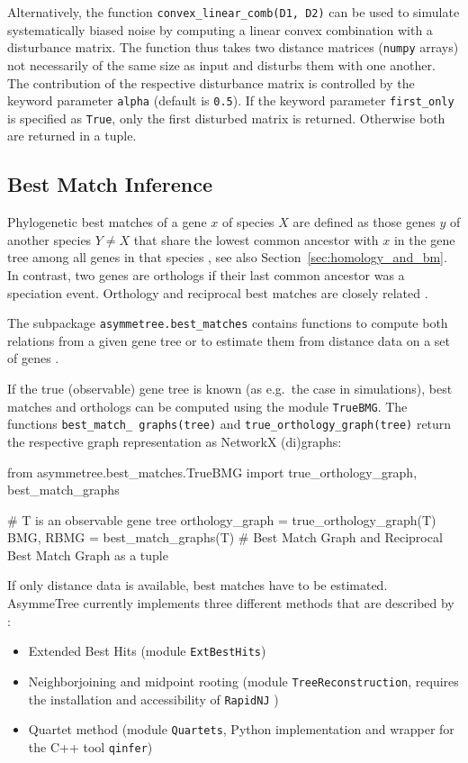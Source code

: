 \documentclass[hidelinks,11pt]{scrreprt}
\begin{document}
Alternatively, the function \texttt{convex\_linear\_comb(D1, D2)} can be used to simulate systematically biased noise by computing a linear convex combination with a disturbance matrix.
The function thus takes two distance matrices (\texttt{numpy} arrays) not necessarily of the same size as input and disturbs them with one another.
The contribution of the respective disturbance matrix is controlled by the keyword parameter \texttt{alpha} (default is \texttt{0.5}).
If the keyword parameter \texttt{first\_only} is specified as \texttt{True}, only the first disturbed matrix is returned.
Otherwise both are returned in a tuple.


\subsection{Best Match Inference}

Phylogenetic best matches of a gene $x$ of species $X$ are defined as those genes $y$ of another species $Y\ne X$ that share the lowest common ancestor with $x$ in the gene tree among all genes in that species \citep{geiss2019a,geiss2020b,geiss2020c}, see also Section~\ref{sec:homology_and_bm}.
In contrast, two genes are orthologs if their last common ancestor was a speciation event.
Orthology and reciprocal best matches are closely related \citep{geiss2020c}.

The subpackage \texttt{asymmetree.best\_matches} contains functions to compute both relations from a given gene tree or to estimate them from distance data on a set of genes \citep{stadler2020}.

If the true (observable) gene tree is known (as e.g.\ the case in simulations), best matches and orthologs can be computed using the module \texttt{TrueBMG}.
The functions \texttt{best\_match\_ graphs(tree)} and \texttt{true\_orthology\_graph(tree)} return the respective graph representation as NetworkX (di)graphs:

\vspace{2mm}
\begin{python}
from asymmetree.best_matches.TrueBMG import true_orthology_graph, best_match_graphs

# T is an observable gene tree
orthology_graph = true_orthology_graph(T)
BMG, RBMG = best_match_graphs(T)    # Best Match Graph and Reciprocal Best Match Graph as a tuple
\end{python}
\vspace{2mm}

If only distance data is available, best matches have to be estimated.
AsymmeTree currently implements three different methods that are described by \citet{stadler2020}:
\begin{itemize}
	\item Extended Best Hits (module \texttt{ExtBestHits})
	\item Neighborjoining and midpoint rooting (module \texttt{TreeReconstruction}, requires the installation and accessibility of \texttt{RapidNJ} \citep{simonsen2008})
	\item Quartet method (module \texttt{Quartets}, Python implementation and wrapper for the C++ tool \texttt{qinfer})
\end{itemize}
\end{document}
